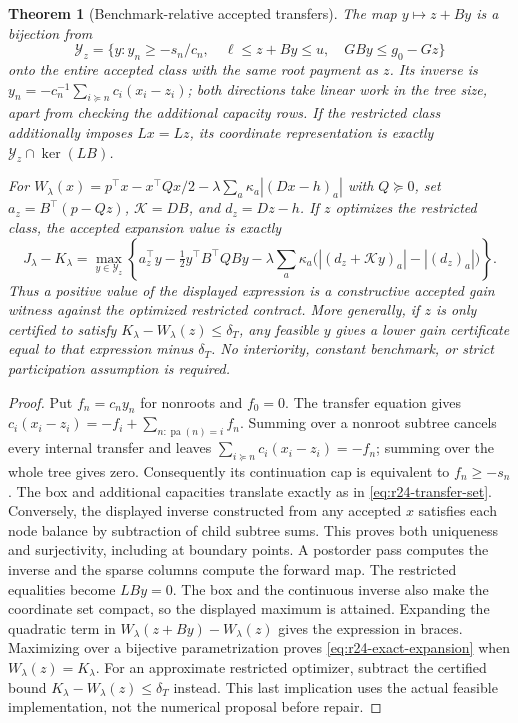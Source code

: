 \documentclass[11pt,letterpaper]{article}
\newtheorem{theorem}{Theorem}[section]
\theoremstyle{definition}
\newcommand{\1}{\mathbf 1}
\begin{document}
\begin{theorem}[Benchmark-relative accepted transfers]\label{thm:r24-transfers}
The map $y\mapsto z+By$ is a bijection from
\begin{equation}\label{eq:r24-transfer-set}
 \mathcal Y_z=\{y:y_n\geq-s_n/c_n,\quad
       \ell\leq z+By\leq u,\quad GBy\leq g_0-Gz\}
\end{equation}
onto the entire accepted class with the same root payment as $z$.
Its inverse is
$y_n=-c_n^{-1}\sum_{i\succeq n}c_i(x_i-z_i)$; both directions take linear
work in the tree size, apart from checking the additional capacity rows.
If the restricted class additionally imposes $Lx=Lz$, its coordinate
representation is exactly $\mathcal Y_z\cap\ker(LB)$.

For
$W_\lambda(x)=p^\top x-x^\top Qx/2-\lambda\sum_a\kappa_a|(Dx-h)_a|$
with $Q\succeq0$, set $a_z=B^\top(p-Qz)$, $\mathcal K=DB$, and $d_z=Dz-h$.
If $z$ optimizes the restricted class, the accepted expansion value is exactly
\begin{equation}\label{eq:r24-exact-expansion}
 J_\lambda-K_\lambda
 =\max_{y\in\mathcal Y_z}\left\{
 a_z^\top y-\tfrac12y^\top B^\top QB y
 -\lambda\sum_a\kappa_a\bigl(|(d_z+\mathcal Ky)_a|-|(d_z)_a|\bigr)\right\}.
\end{equation}
Thus a positive value of the displayed expression is a constructive accepted
gain witness against the optimized restricted contract. More generally, if
$z$ is only certified to satisfy $K_\lambda-W_\lambda(z)\leq\delta_T$,
any feasible $y$ gives a lower gain certificate equal to that expression minus
$\delta_T$. No interiority, constant benchmark, or strict participation
assumption is required.
\end{theorem}
\begin{proof}
Put $f_n=c_n y_n$ for nonroots and $f_0=0$. The transfer equation gives
$c_i(x_i-z_i)=-f_i+\sum_{n:\operatorname{pa}(n)=i}f_n$.
Summing over a nonroot subtree cancels every internal transfer and leaves
$\sum_{i\succeq n}c_i(x_i-z_i)=-f_n$; summing over the whole tree gives zero.
Consequently its continuation cap is equivalent to $f_n\geq-s_n$.
The box and additional capacities translate exactly as in
\eqref{eq:r24-transfer-set}. Conversely, the displayed inverse constructed
from any accepted $x$ satisfies each node balance by subtraction of child
subtree sums. This proves both uniqueness and surjectivity, including at
boundary points. A postorder pass computes the inverse and the sparse columns
compute the forward map. The restricted equalities become $LBy=0$.
The box and the continuous inverse also make the coordinate set compact, so the displayed maximum is attained. Expanding the quadratic term in $W_\lambda(z+By)-W_\lambda(z)$ gives the
expression in braces. Maximizing over a bijective parametrization proves
\eqref{eq:r24-exact-expansion} when $W_\lambda(z)=K_\lambda$.
For an approximate restricted optimizer, subtract the certified bound
$K_\lambda-W_\lambda(z)\leq\delta_T$ instead. This last implication uses the
actual feasible implementation, not the numerical proposal before repair.
\end{proof}
\end{document}
